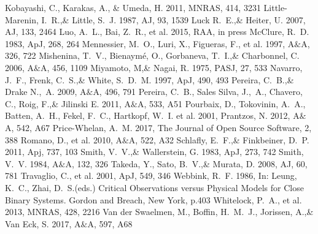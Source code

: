 \documentclass[a4paper,fleqn,usenatbib]{mnras}
\begin{document}
\begin{thebibliography}{99}
Kobayashi, C., Karakas, A., \& Umeda, H. 2011, 
MNRAS, 414, 3231
Little-Marenin, I.~R.,\& Little, S.~J. 1987, 
AJ, 93, 1539
Luck R.~E.,\& Heiter, U. 2007, 
AJ, 133, 2464
Luo, A.~L., Bai, Z.~R., et al. 2015, 
RAA, in press
McClure, R.~D. 1983, 
ApJ, 268, 264
Mennessier, M.~O., Luri, X., Figueras, F., et al. 1997, 
A$\&$A, 326, 722
Mishenina, T.~V., Bienaym\' e, O., Gorbaneva, T.~I.,\& Charbonnel, C. 2006, 
A$\&$A, 456, 1109
Miyamoto, M,\& Nagai, R. 1975, 
PASJ, 27, 533
Navarro, J.~F., Frenk, C.~S.,\& White, S.~D.~M. 1997, 
ApJ, 490, 493
Pereira, C.~B.,\& Drake N.,~A. 2009, 
A$\&$A, 496, 791
Pereira, C.~B., Sales Silva, J.,~A., Chavero, C., Roig, F.,\& Jilinski E. 2011, 
A$\&$A, 533, A51
Pourbaix, D., Tokovinin, A.~A., Batten, A.~H., Fekel, F.~C., Hartkopf, W.~I. et al. 2001, 
Prantzos, N. 2012, 
A$\&$A, 542, A67
Price-Whelan, A.~M. 2017, 
The Journal of Open Source Software, 2, 388
Romano, D., et al. 2010, 
A$\&$A, 522, A32
Schlafly, E.~F.,\& Finkbeiner, D.~P. 2011, 
Apj, 737, 103
Smith, V.~V.,\& Wallerstein, G. 1983, 
ApJ, 273, 742
Smith, V.~V. 1984, 
A$\&$A, 132, 326
Takeda, Y., Sato, B.~V.,\& Murata, D. 2008, 
AJ, 60, 781
Travaglio, C., et al. 2001, 
ApJ, 549, 346
Webbink, R.~F. 1986, 
In: Leung, K.~C., Zhai, D.~S.(eds.) Critical Observations versus Physical Models for Close Binary Systems. Gordon and Breach, New York, p.403
Whitelock, P.~A., et al. 2013, 
MNRAS, 428, 2216
Van der Swaelmen, M., Boffin, H.~M.~J., Jorissen, A.,\& Van Eck, S. 2017, 
A$\&$A, 597, A68






\end{thebibliography}
\end{document}
